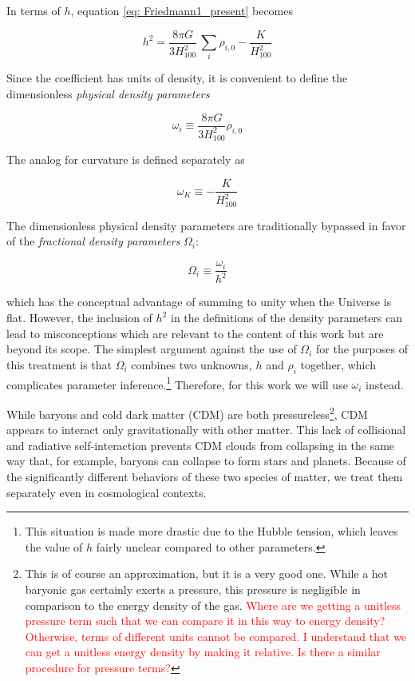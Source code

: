 
In terms of $h$, equation \ref{eq: Friedmann1_present} becomes

\begin{equation}
h^2 = \frac{8 \pi G}{3 H_{100}^2} \, \sum_i \rho_{i, 0} - \frac{K}{H^2_{100}}
\end{equation}


Since the coefficient has units of density, it is convenient to define the
dimensionless \textit{physical density parameters}

\begin{equation}
\omega_i \equiv \frac{8 \pi G}{3 H_{100}^2} \rho_{i, 0}
\end{equation}

The analog for curvature is defined separately as

\begin{equation}
\omega_{K} \equiv -\frac{K}{H_{100}^2}
\end{equation}

The dimensionless physical density parameters are traditionally bypassed in
favor of the \textit{fractional density parameters} $\Omega_i$:

\begin{equation}
\Omega_i \equiv \frac{\omega_i}{h^2}
\end{equation} %

which has the conceptual advantage of summing to unity when the Universe is
flat. However, the inclusion of $h^2$ in the definitions of the density
parameters can lead to misconceptions which are relevant to the content of
this work but are beyond its scope. The simplest argument against the use of 
$\Omega_i$ for the purposes of
this treatment is that $\Omega_i$ combines two unknowns, $h$ and $\rho_i$
together, which complicates parameter inference.\footnote{This situation is 
made more drastic due to the Hubble tension, which leaves the value of $h$ 
fairly unclear compared to other parameters.} Therefore, for this work we
will use $\omega_i$ instead.


While baryons and cold dark matter (CDM) are both pressureless\footnote{This 
is of
course an approximation, but it is a very good one. While a hot baryonic gas 
certainly exerts a pressure, this pressure is negligible in comparison to the energy density of the gas. \textcolor{red}{Where are we getting a unitless
pressure term such that we can compare it in this way to energy density?
Otherwise, terms of different units cannot be compared. I understand that we
can get a unitless energy density by making it relative. Is there a similar
procedure for pressure terms?}}, CDM appears to interact only gravitationally
with other matter. This lack of collisional and radiative self-interaction
prevents CDM clouds from collapsing in the same way that, for example,
baryons can collapse to form stars and planets. Because of the significantly
different behaviors of these two species of matter, we treat them separately
even in cosmological contexts.

